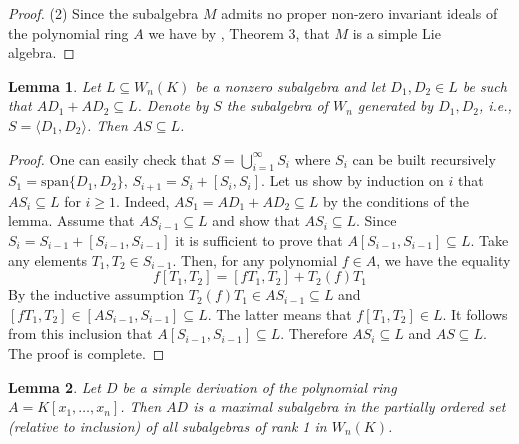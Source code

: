 \documentclass[12pt,a4paper]{amsart}
\theoremstyle{plain}
\newtheorem{lemma}{Lemma}
\theoremstyle{definition}
\begin{document}
{\begin{proof}
		(2) Since the subalgebra $M$ admits  no proper non-zero invariant ideals of the polynomial ring $A$ we have by \cite{J1},  Theorem 3, that  $M$ is a simple Lie algebra.
	\end{proof}
	
	
	
	\begin{lemma}\label{lemma1}
		Let $L \subseteq W_n(K)$ be a nonzero subalgebra and let $D_1, D_2 \in L$ be such that $AD_1+AD_2 \subseteq L$. Denote by $S$ the subalgebra of $W_n$ generated by $D_1, D_2$, i.e., $S = \langle D_1, D_2 \rangle$. Then $AS \subseteq L$.
	\end{lemma}
	
	\begin{proof}
		One can easily check that $S = \bigcup_{i=1}^\infty S_i$ where $S_i$ can be built recursively
		$S_1 = \text{span} \{ D_1, D_2 \}$, $S_{i+1} = S_i + [S_i, S_i]$.
		Let us show by induction on $i$ that $AS_i \subseteq L$ for $i \geq 1$. Indeed, $AS_1 = AD_1+AD_2 \subseteq L$ by the conditions of the lemma. Assume that $AS_{i-1} \subseteq L$ and show that $AS_i \subseteq L$. Since $S_i = S_{i-1} + [S_{i-1}, S_{i-1}]$ it is sufficient to prove that $A[S_{i-1}, S_{i-1}] \subseteq L$. Take any elements $T_1, T_2 \in S_{i-1}$. Then, for any polynomial $f \in A$, we have the equality
		\[ f [T_1, T_2] = [f T_1, T_2] + T_2(f) T_1 \]
		By the inductive assumption $T_2(f) T_1 \in AS_{i-1}\subseteq L$ and $[f T_1, T_2] \in [AS_{i-1}, S_{i-1}] \subseteq L$. The latter means that  $f [T_1, T_2] \in L$. It follows from this inclusion that $A[S_{i-1}, S_{i-1}] \subseteq L.$ Therefore $AS_i \subseteq L$ and $AS\subseteq L.$ 
		The proof is complete.
	\end{proof}
	
	\begin{lemma}\label{lemma2}
		Let $D$ be a simple derivation of the polynomial ring $A=K[x_1, \dots, x_n]$. Then $AD$ is a maximal subalgebra in the partially ordered set (relative to inclusion) of all subalgebras of rank 1 in $W_n(K)$.
	\end{lemma}
	
}
\end{document}

